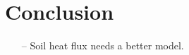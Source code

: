 \documentclass{scrreprt}
\begin{document}











\chapter{Conclusion} \label{ch:conclusion}

\begin{itemize}
  \item[--] Soil heat flux needs a better model.
\end{itemize}




\end{document}
